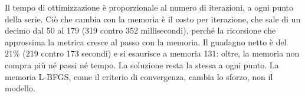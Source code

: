 Il tempo di ottimizzazione è proporzionale al numero di
iterazioni, a ogni punto della serie. Ciò che cambia con la memoria
è il costo per iterazione, che sale di un decimo dal 50 al 179
(319 contro 352 millisecondi), perché la ricorsione che
approssima la metrica cresce al passo con la memoria. Il guadagno
netto è del 21\% (219 contro 173 secondi) e si esaurisce a memoria
131: oltre, la memoria non compra più né passi né tempo. La
soluzione resta la stessa a ogni punto. La memoria L-BFGS, come il
criterio di convergenza, cambia lo sforzo, non il modello.
